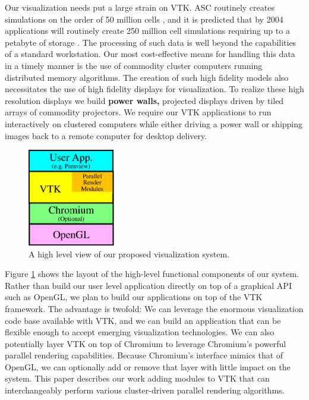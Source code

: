 \documentclass[letterpaper]{acmsiggraph}
\newcommand{\keyterm}[1]{\textbf{#1}}
\begin{document}
  Our visualization needs put a large strain on VTK.  ASC routinely
  creates simulations on the order of 50 million cells \cite{Heermann99},
  and it is predicted that by 2004 applications will routinely create 250
  million cell simulations requiring up to a petabyte of storage
  \cite{Smith98}.  The processing of such data is well beyond the
  capabilities of a standard workstation.  Our most cost-effective means
  for handling this data in a timely manner is the use of commodity cluster
  computers running distributed memory algorithms.  The creation of such
  high fidelity models also necessitates the use of high fidelity displays
  for visualization.  To realize these high resolution displays we build
  \keyterm{power walls,} projected displays driven by tiled arrays of
  commodity projectors.  We require our VTK applications to run
  interactively on clustered computers while either driving a power wall or
  shipping images back to a remote computer for desktop delivery.

  \begin{figure}
    \center
    \includegraphics[width=1.5in]{images/AppLayers}
    \caption{A high level view of our proposed visualization system.}
    \label{fig:applayers}
  \end{figure}
  Figure \ref{fig:applayers} shows the layout of the high-level functional
  components of our system.  Rather than build our user level application
  directly on top of a graphical API such as OpenGL, we plan to build our
  applications on top of the VTK framework.  The advantage is twofold: We
  can leverage the enormous visualization code base available with VTK, and
  we can build an application that can be flexible enough to accept
  emerging visualization technologies.  We can also potentially layer VTK
  on top of Chromium to leverage Chromium's powerful parallel rendering
  capabilities.  Because Chromium's interface mimics that of OpenGL, we can
  optionally add or remove that layer with little impact on the system.
  This paper describes our work adding modules to VTK that can
  interchangeably perform various cluster-driven parallel rendering
  algorithms.
\end{document}
